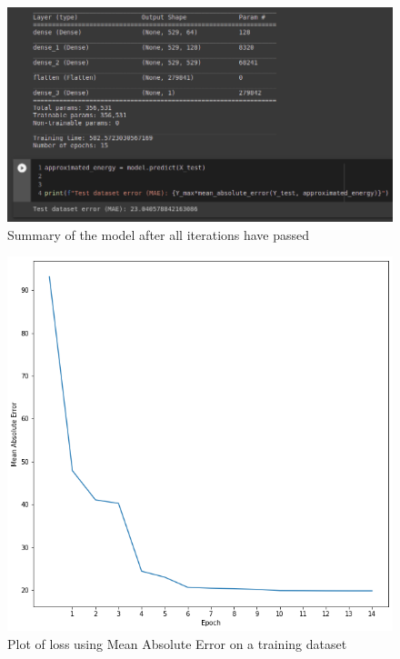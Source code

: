 \documentclass[a4paper,oneside,openright,11pt]{book}
\begin{document}
\begin{figure}[h!]
\centering
\includegraphics[scale=0.6]{DocumentFigures/ZdjeciaWalidacja/MAEtest.png}
\caption{Summary of the model after all iterations have passed}
\end{figure}




\begin{figure}[h!]
\centering
\includegraphics[scale=0.8]{DocumentFigures/ZdjeciaWalidacja/Losstraining.png}
\caption{Plot of loss using Mean Absolute Error on a training dataset}
\end{figure}
\end{document}
